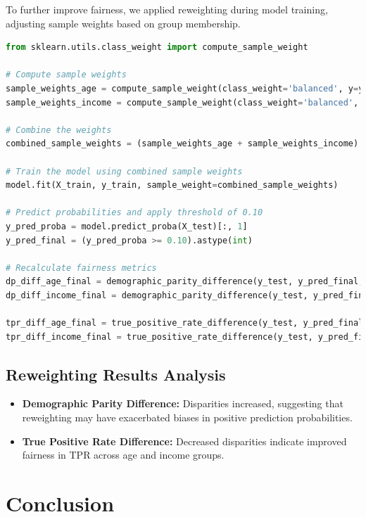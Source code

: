 \documentclass[12pt,a4paper]{report}
\begin{document}
To further improve fairness, we applied reweighting during model training, adjusting sample weights based on group membership.\\

\begin{lstlisting}[language=Python, caption={Reweighting to Address Fairness Issues}]
from sklearn.utils.class_weight import compute_sample_weight

# Compute sample weights
sample_weights_age = compute_sample_weight(class_weight='balanced', y=y_train)
sample_weights_income = compute_sample_weight(class_weight='balanced', y=y_train)

# Combine the weights
combined_sample_weights = (sample_weights_age + sample_weights_income) / 2

# Train the model using combined sample weights
model.fit(X_train, y_train, sample_weight=combined_sample_weights)

# Predict probabilities and apply threshold of 0.10
y_pred_proba = model.predict_proba(X_test)[:, 1]
y_pred_final = (y_pred_proba >= 0.10).astype(int)

# Recalculate fairness metrics
dp_diff_age_final = demographic_parity_difference(y_test, y_pred_final, sensitive_features=X_test['customer_age'])
dp_diff_income_final = demographic_parity_difference(y_test, y_pred_final, sensitive_features=X_test['income'])

tpr_diff_age_final = true_positive_rate_difference(y_test, y_pred_final, sensitive_features=X_test['customer_age'])
tpr_diff_income_final = true_positive_rate_difference(y_test, y_pred_final, sensitive_features=X_test['income'])
\end{lstlisting}

\subsection{Reweighting Results Analysis}

\begin{itemize}
    \item \textbf{Demographic Parity Difference:} Disparities increased, suggesting that reweighting may have exacerbated biases in positive prediction probabilities.
    
    \item \textbf{True Positive Rate Difference:} Decreased disparities indicate improved fairness in TPR across age and income groups.
\end{itemize}

\section{Conclusion}
\end{document}
